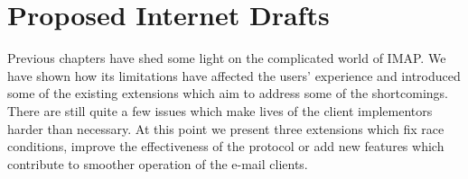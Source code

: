 \documentclass[trojita]{subfiles}
\begin{document}
\chapter{Proposed Internet Drafts}

Previous chapters have shed some light on the complicated world of IMAP.  We have shown how its limitations have
affected the users' experience and introduced some of the existing extensions which aim to address some of the
shortcomings.  There are still quite a few issues which make lives of the client implementors harder than necessary.  At
this point we present three extensions which fix race conditions, improve the effectiveness of the protocol or add new
features which contribute to smoother operation of the e-mail clients.

\end{document}
